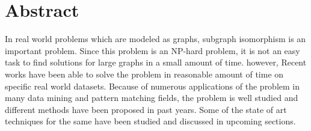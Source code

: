 \documentclass[
10pt, %
a4paper, %
oneside, %
headinclude,footinclude, %
BCOR5mm, %
]{scrartcl}
\title{\normalfont\spacedallcaps{Initial Report on MTP}} %
\author{\spacedlowsmallcaps{Shreyas Phanse}} %
\date{} %
\begin{document}

\renewcommand{\sectionmark}[1]{\markright{\spacedlowsmallcaps{#1}}} %
\lehead{\mbox{\llap{\small\thepage\kern1em\color{halfgray} \vline}\color{halfgray}\hspace{0.5em}\rightmark\hfil}} %

\pagestyle{scrheadings} %


\maketitle %

\setcounter{tocdepth}{2} %

\tableofcontents %

\listoffigures %



\section*{Abstract} %

In real world problems which are modeled as graphs, subgraph isomorphism is an important problem. Since this problem is an NP-hard problem, it is not an easy task to find solutions for large graphs in a small amount of time. however, Recent works have been able to solve the problem in reasonable amount of time on specific real world datasets. Because of numerous applications of the problem in many data mining and pattern matching fields, the problem is well studied and different methods have been proposed in past years. Some of the state of art techniques for the same have been studied and discussed in upcoming sections.
\end{document}
